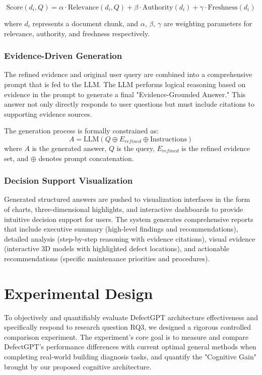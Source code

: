 \begin{equation}
\text{Score}(d_i, Q) = \alpha \cdot \text{Relevance}(d_i, Q) + \beta \cdot \text{Authority}(d_i) + \gamma \cdot \text{Freshness}(d_i)
\end{equation}

where $d_i$ represents a document chunk, and $\alpha$, $\beta$, $\gamma$ are weighting parameters for relevance, authority, and freshness respectively.

\subsubsection{Evidence-Driven Generation}

The refined evidence and original user query are combined into a comprehensive prompt that is fed to the LLM. The LLM performs logical reasoning based on evidence in the prompt to generate a final "Evidence-Grounded Answer." This answer not only directly responds to user questions but must include citations to supporting evidence sources.

The generation process is formally constrained as:
\begin{equation}
A = \text{LLM}(Q \oplus E_{refined} \oplus \text{Instructions})
\end{equation}
where $A$ is the generated answer, $Q$ is the query, $E_{refined}$ is the refined evidence set, and $\oplus$ denotes prompt concatenation.

\subsubsection{Decision Support Visualization}

Generated structured answers are pushed to visualization interfaces in the form of charts, three-dimensional highlights, and interactive dashboards to provide intuitive decision support for users. The system generates comprehensive reports that include executive summary (high-level findings and recommendations), detailed analysis (step-by-step reasoning with evidence citations), visual evidence (interactive 3D models with highlighted defect locations), and actionable recommendations (specific maintenance priorities and procedures).

\section{Experimental Design}

To objectively and quantifiably evaluate DefectGPT architecture effectiveness and specifically respond to research question RQ3, we designed a rigorous controlled comparison experiment. The experiment's core goal is to measure and compare DefectGPT's performance differences with current optimal general methods when completing real-world building diagnosis tasks, and quantify the "Cognitive Gain" brought by our proposed cognitive architecture.

